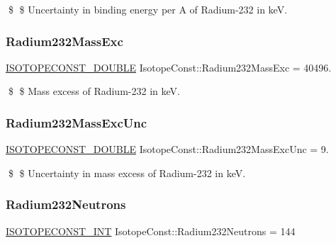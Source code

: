 \$ \$ Uncertainty in binding energy per A of Radium-\/232 in keV. \mbox{\label{group___isotope_const-_radium-_ra232_gadc2594c8dc27b014c9bf7f0f55259ace}} 
\subsubsection{\texorpdfstring{Radium232\+Mass\+Exc}{Radium232MassExc}}
{\footnotesize\ttfamily \mbox{\hyperlink{group___isotope_const-_macros_ga8f45a7272ce02c0b4c65c44636ed719a}{I\+S\+O\+T\+O\+P\+E\+C\+O\+N\+S\+T\+\_\+\+D\+O\+U\+B\+LE}} Isotope\+Const\+::\+Radium232\+Mass\+Exc = 40496.}

\$ \$ Mass excess of Radium-\/232 in keV. \mbox{\label{group___isotope_const-_radium-_ra232_gafbd385af71331b38bec679e1967183c6}} 
\subsubsection{\texorpdfstring{Radium232\+Mass\+Exc\+Unc}{Radium232MassExcUnc}}
{\footnotesize\ttfamily \mbox{\hyperlink{group___isotope_const-_macros_ga8f45a7272ce02c0b4c65c44636ed719a}{I\+S\+O\+T\+O\+P\+E\+C\+O\+N\+S\+T\+\_\+\+D\+O\+U\+B\+LE}} Isotope\+Const\+::\+Radium232\+Mass\+Exc\+Unc = 9.}

\$ \$ Uncertainty in mass excess of Radium-\/232 in keV. \mbox{\label{group___isotope_const-_radium-_ra232_gafb65dcdff3ba8b4a0ef8f1a4a825fb62}} 
\subsubsection{\texorpdfstring{Radium232\+Neutrons}{Radium232Neutrons}}
{\footnotesize\ttfamily \mbox{\hyperlink{group___isotope_const-_macros_ga5f18360b3e99483a35c32d789e62621c}{I\+S\+O\+T\+O\+P\+E\+C\+O\+N\+S\+T\+\_\+\+I\+NT}} Isotope\+Const\+::\+Radium232\+Neutrons = 144}

